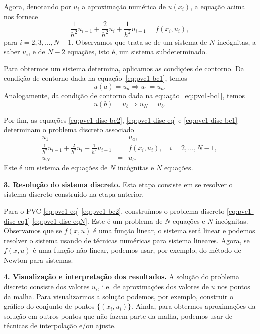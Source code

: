 Agora, denotando por $u_i$ a aproximação numérica de $u(x_i)$, a equação acima nos fornece
\begin{equation}\label{eq:pvc1-disc-eq}
\frac{1}{h^2}u_{i-1} + \frac{2}{h^2}u_i + \frac{1}{h^2}u_{i+1} = f(x_i, u_i),
\end{equation}
para $i=2, 3, \dotsc, N-1$. Observamos que trata-se de um sistema de $N$ incógnitas, a saber $u_i$, e de $N-2$ equações, isto é, um sistema subdeterminado.

Para obtermos um sistema determina, aplicamos as condições de contorno. Da condição de contorno dada na equação~\eqref{eq:pvc1-bc1}, temos
\begin{equation}\label{eq:pvc1-disc-bc1}
  u(a) = u_a\Rightarrow u_1 = u_a.
\end{equation}
Analogamente, da condição de contorno dada na equação~\eqref{eq:pvc1-bc1}, temos
\begin{equation}\label{eq:pvc1-disc-bc2}
  u(b) = u_b\Rightarrow u_N = u_b.
\end{equation}

Por fim, as equações \eqref{eq:pvc1-disc-bc2}, \eqref{eq:pvc1-disc-eq} e \eqref{eq:pvc1-disc-bc1} determinam o problema discreto associado
\begin{eqnarray}
  u_1 &=& u_a,\label{eq:pvc1-disc-eq1}\\
  \frac{1}{h^2}u_{i-1} + \frac{2}{h^2}u_i + \frac{1}{h^2}u_{i+1} &=& f(x_i, u_i),\quad i=2, \dotsc, N-1,\label{eq:pvc1-disc-eqi}\\
  u_N &=& u_b.\label{eq:pvc1-disc-eqN}
\end{eqnarray}
Este é um sistema de equações de $N$ incógnitas e $N$ equações.

{\bf 3. Resolução do sistema discreto.} Esta etapa consiste em se resolver o sistema discreto construído na etapa anterior. 

Para o PVC \eqref{eq:pvc1-eq}-\eqref{eq:pvc1-bc2}, construímos o problema discreto \eqref{eq:pvc1-disc-eq1}-\eqref{eq:pvc1-disc-eqN}. Este é um problema de $N$ equações e $N$ incógnitas. Observamos que se $f(x, u)$ é uma função linear, o sistema será linear e podemos resolver o sistema usando de técnicas numéricas para sistema lineares. Agora, se $f(x, u)$ é uma função não-linear, podemos usar, por exemplo, do método de Newton para sistemas.

{\bf 4. Visualização e interpretação dos resultados.} A solução do problema discreto consiste dos valores $u_i$, i.e. de aproximações dos valores de $u$ nos pontos da malha. Para visualizarmos a solução podemos, por exemplo, construir o gráfico do conjunto de pontos $\{(x_i, u_i)\}$. Ainda, para obtermos aproximações da solução em outros pontos que não fazem parte da malha, podemos usar de técnicas de interpolação e/ou ajuste.


